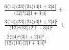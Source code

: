\documentclass[varwidth, border=5pt]{standalone}
\begin{document}
\begin{my}
$\begin{gathered}
\scriptscriptstyle\frac{6⟨14⟩⟨23⟩⟨24⟩⟨3|1+2|4]}{⟨12⟩³⟨2|1+3|4]} +\\
\scriptscriptstyle\frac{3⟨14⟩⟨23⟩⟨24⟩⟨3|1+2|4]²}{⟨12⟩²⟨13⟩⟨2|1+3|4]²} +\\
\scriptscriptstyle\frac{2⟨24⟩²⟨3|1+2|4]³}{⟨12⟩⟨13⟩⟨2|1+3|4]³} \phantom{+}
\end{gathered}$
\end{my}
\end{document}
